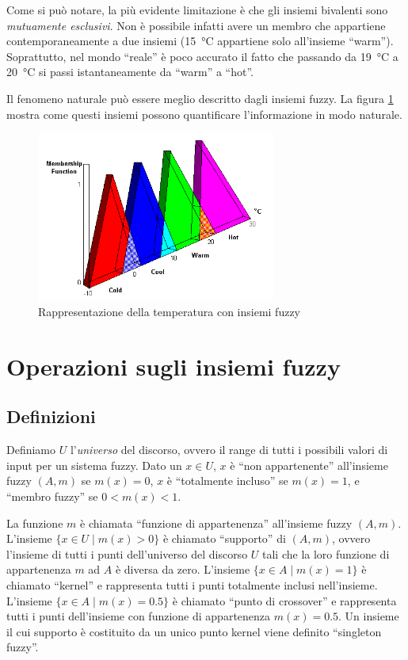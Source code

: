 Come si può notare, la più evidente limitazione è che gli insiemi bivalenti sono \emph{mutuamente esclusivi}. Non è possibile infatti avere un membro che appartiene contemporaneamente a due insiemi (\SI{15}{\celsius} appartiene solo all’insieme ``warm''). Soprattutto, nel mondo ``reale'' è poco accurato il fatto che passando da \SI{19}{\celsius} a \SI{20}{\celsius} si passi istantaneamente da ``warm'' a ``hot''.

Il fenomeno naturale può essere meglio descritto dagli insiemi fuzzy. La figura \ref{fig:fuzzy-sets} mostra come questi insiemi possono quantificare l’informazione in modo naturale.

\begin{figure}[hbt]
  \centering
  \includegraphics[width=0.7\textwidth]{img/fuzzy-fuzzy_temp.png}
  \caption{Rappresentazione della temperatura con insiemi fuzzy}
  \label{fig:fuzzy-sets}
\end{figure}

\section{Operazioni sugli insiemi fuzzy}
\subsection{Definizioni}
Definiamo $U$ l'\emph{universo} del discorso, ovvero il range di tutti i possibili valori di input per un sistema fuzzy. Dato un $x \in U$, $x$ è ``non appartenente'' all'insieme fuzzy $(A,m)$ se $m(x) = 0$, $x$ è ``totalmente incluso'' se $m(x) = 1$, e ``membro fuzzy'' se $0 < m(x) < 1$.

La funzione $m$ è chiamata ``funzione di appartenenza'' all'insieme fuzzy $(A, m)$. L'insieme $\{x\in U\mid m(x)>0\}$ è chiamato ``supporto'' di $(A,m)$, ovvero l’insieme di tutti i punti dell’universo del discorso $U$ tali che la loro funzione di appartenenza $m$ ad $A$ è diversa da zero. L'insieme $\{x\in A\mid m(x)=1\}$ è chiamato ``kernel'' e rappresenta tutti i punti totalmente inclusi nell'insieme. L'insieme $\{x\in A\mid m(x)=0.5\}$ è chiamato ``punto di crossover'' e rappresenta tutti i punti dell'insieme con funzione di appartenenza $m(x)=0.5$. Un insieme il cui supporto è costituito da un unico punto kernel viene definito ``singleton fuzzy''.

